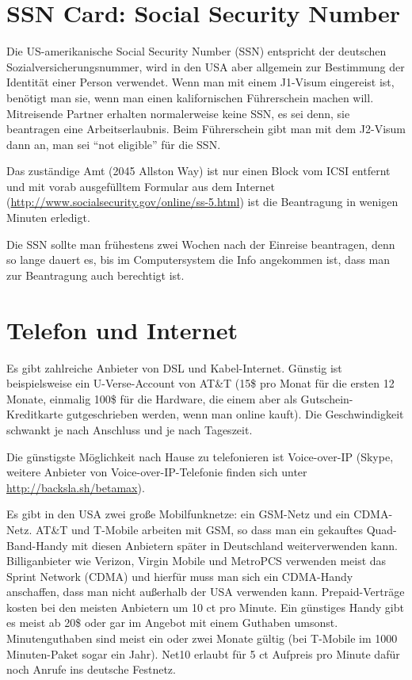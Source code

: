 \documentclass[a4paper]{scrreprt}
\begin{document}
\section{SSN Card: Social Security Number}

Die US-amerikanische Social Security Number (SSN) entspricht der deutschen Sozialversicherungsnummer, wird in den USA aber allgemein zur Bestimmung der Identität einer Person verwendet. Wenn man mit einem J1-Visum eingereist ist, benötigt man sie, wenn man einen kalifornischen Führerschein machen will. Mitreisende Partner erhalten normalerweise keine SSN, es sei denn, sie beantragen eine Arbeitserlaubnis. Beim Führerschein gibt man mit dem J2-Visum dann an, man sei "`not eligible"' für die SSN.

Das zuständige Amt (2045 Allston Way) ist nur einen Block vom ICSI entfernt und mit vorab ausgefülltem Formular aus dem Internet (\url{http://www.socialsecurity.gov/online/ss-5.html}) ist die Beantragung in wenigen Minuten erledigt.

Die SSN sollte man frühestens zwei Wochen nach der Einreise beantragen, denn so lange dauert es, bis im Computersystem die Info angekommen ist, dass man zur Beantragung auch berechtigt ist.


\section{Telefon und Internet}

Es gibt zahlreiche Anbieter von DSL und Kabel-Internet. Günstig ist beispielsweise ein U-Verse-Account von AT\&T (15\$ pro Monat für die ersten 12 Monate, einmalig 100\$ für die Hardware, die einem aber als Gutschein-Kreditkarte gutgeschrieben werden, wenn man online kauft). Die Geschwindigkeit schwankt je nach Anschluss und je nach Tageszeit.

Die günstigste Möglichkeit nach Hause zu telefonieren ist Voice-over-IP (Skype, weitere Anbieter von Voice-over-IP-Telefonie finden sich unter  \url{http://backsla.sh/betamax}).

Es gibt in den USA zwei große Mobilfunknetze: ein GSM-Netz und ein CDMA-Netz. AT\&T und T-Mobile arbeiten mit GSM, so dass man ein gekauftes Quad-Band-Handy mit diesen Anbietern später in Deutschland weiterverwenden kann. Billiganbieter wie Verizon, Virgin Mobile und MetroPCS verwenden meist das Sprint Network (CDMA) und hierfür muss man sich ein CDMA-Handy anschaffen, dass man nicht außerhalb der USA verwenden kann.
Prepaid-Verträge kosten bei den meisten Anbietern um 10 ct pro Minute. Ein günstiges Handy gibt es meist ab 20\$ oder gar im Angebot mit einem Guthaben umsonst. Minutenguthaben sind meist ein oder zwei Monate gültig (bei T-Mobile im 1000 Minuten-Paket sogar ein Jahr). Net10 erlaubt für 5 ct Aufpreis pro Minute dafür noch Anrufe ins deutsche Festnetz.
\end{document}

